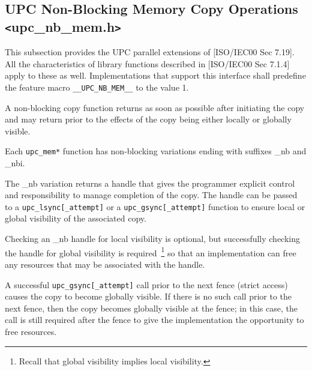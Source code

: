 \def \memcpy  {{\tt upc\_memcpy}}
\def \memget  {{\tt upc\_memget}}
\def \memput  {{\tt upc\_memput}}
\def \memset  {{\tt upc\_memset}}

\def \memall  {{\tt upc\_mem\{put, get, cpy\}}}
\def \memstar {{\tt upc\_mem*}}

\def \gsync  {{\tt upc\_gsync[\_attempt]}}
\def \gsynci {{\tt upc\_gsynci[\_attempt]}}
\def \lsync  {{\tt upc\_lsync[\_attempt]}}
\def \lsynci {{\tt upc\_lsynci[\_attempt]}}

\def \complete {{\tt UPC\_COMPLETE\_HANDLE}}

\subsection{UPC Non-Blocking Memory Copy Operations
            \texttt{<}upc\_nb\_mem.h\texttt{>}}

\npf This subsection provides the UPC parallel extensions of
[ISO/IEC00 Sec 7.19].  All the characteristics of library
functions described in [ISO/IEC00 Sec 7.1.4] apply to these as well.
Implementations that support this interface shall predefine the
feature macro {\tt \_\_UPC\_NB\_MEM\_\_} to the value 1.

\np A non-blocking copy function returns as soon as possible after
initiating the copy and may return prior to the effects of the copy being
either locally or globally visible.

\np Each \memstar{} function has non-blocking variations ending with suffixes
\_nb and \_nbi.

\np The \_nb variation returns a handle that gives the programmer explicit
control and responsibility to manage completion of the copy.  The handle
can be passed to a \lsync{} or a \gsync{} function to ensure local or
global visibility of the associated copy.

\np Checking an \_nb handle for local visibility is optional, but successfully
checking the handle for global visibility is required~\footnote{Recall that
global visibility implies local visibility.} so that an implementation can free
any resources that may be associated with the handle.

\np A successful \gsync{} call prior to the next fence (strict access)
causes the copy to become globally visible.  If there is no such call
prior to the next fence, then the copy becomes globally visible at the
fence; in this case, the call is still required after the fence to give
the implementation the opportunity to free resources.

